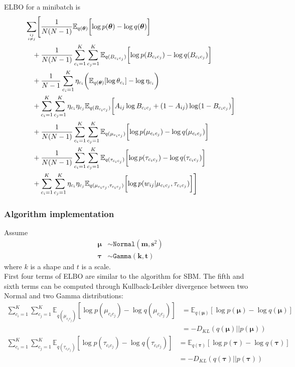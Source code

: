 \documentclass{article}
\renewcommand{\v}[1]{\bm{#1}}
\newcommand{\E}{\mathbb{E}}
\begin{document}
ELBO for a minibatch is
\begin{equation}
\begin{split}
& \sum_{ij \atop i \neq j} \Biggl[ \frac{1}{N (N - 1)} \E_{q(\v{\theta})}\biggl[\log p(\v{\theta}) - \log q(\v{\theta})\biggr]  \\
&  \quad + \frac{1}{N (N - 1)} \sum_{c_i=1}^K \sum_{c_j=1}^K  \E_{q(B_{c_ic_j})}\biggl[\log p(B_{c_ic_j}) - \log q(B_{c_ic_j})\biggr] \\
&  \quad + \frac{1}{N - 1} \sum_{c_i=1}^K \eta_{c_i} \biggl(\E_{q(\v{\theta})}[\log \theta_{c_i}] - \log \eta_{c_i}\biggr) \\
&  \quad 
+ \sum_{c_i=1}^K \sum_{c_j=1}^K \eta_{c_i} \eta_{c_j}
\E_{q(B_{c_ic_j})}\biggl[ A_{ij} \log B_{c_ic_j} + (1 - A_{ij}) \log (1 - B_{c_ic_j}) \biggr]\\
&  \quad + \frac{1}{N (N - 1)} \sum_{c_i=1}^K \sum_{c_j=1}^K  \E_{q(\mu_{c_ic_j})}\biggl[\log p(\mu_{c_ic_j}) - \log q(\mu_{c_ic_j})\biggr] \\
&  \quad + \frac{1}{N (N - 1)} \sum_{c_i=1}^K \sum_{c_j=1}^K  \E_{q(\tau_{c_ic_j})}\biggl[\log p(\tau_{c_ic_j}) - \log q(\tau_{c_ic_j})\biggr] \\
&  \quad + \sum_{c_i=1}^K \sum_{c_j=1}^K \eta_{c_i} \eta_{c_j}
\E_{q(\mu_{c_ic_j},\tau_{c_ic_j})}\biggl[ \log p(w_{ij} | \mu_{c_ic_j}, \tau_{c_ic_j}) \biggr]
\Biggr]
\end{split}
\end{equation}

\subsubsection{Algorithm implementation}
 Assume
\begin{align*}
\v{\mu} &\sim \mathtt{Normal}(\v{m}, \v{s}^2)\\
\v{\tau} &\sim \mathtt{Gamma}(\v{k}, \v{t})
\end{align*}
where $k$ is a shape and $t$ is a scale.\\

First four terms of ELBO are similar to the algorithm for SBM. The fifth and sixth terms can be computed through Kullback-Leibler divergence between two Normal and two Gamma distributions:
\begin{equation}
\begin{split}
\sum_{c_i=1}^K \sum_{c_j=1}^K \E_{q(\mu_{c_ic_j})}[\log p(\mu_{c_ic_j}) - \log q(\mu_{c_ic_j})] &= 
\E_{q(\v{\mu})}[\log p(\v{\mu}) - \log q(\v{\mu})]\\ &= - D_{KL}\left(q(\v{\mu})||p(\v{\mu})\right)
\end{split}
\end{equation}
\begin{equation}
\begin{split}
\sum_{c_i=1}^K \sum_{c_j=1}^K \E_{q(\tau_{c_ic_j})}[\log p(\tau_{c_ic_j}) - \log q(\tau_{c_ic_j})] &= 
\E_{q(\v{\tau})}[\log p(\v{\tau}) - \log q(\v{\tau})]\\ &= - D_{KL}\left(q(\v{\tau})||p(\v{\tau})\right)
\end{split}
\end{equation}
 
\end{document}
